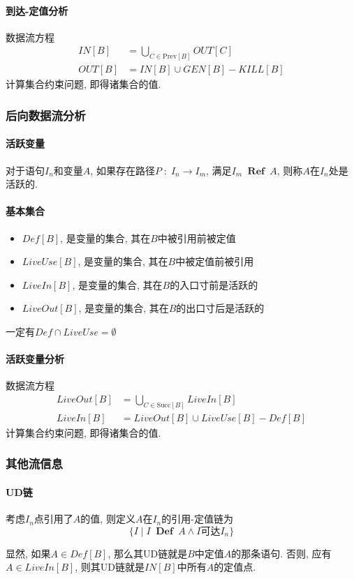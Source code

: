 \documentclass{ctexart}
\DeclareMathOperator{\Def}{\;\mathbf{Def}\;}
\DeclareMathOperator{\Ref}{\;\mathbf{Ref}\;}
\begin{document}
\paragraph{到达-定值分析}
    数据流方程
    \begin{align*}
        IN[B] &= \bigcup_{C \in \mathrm{Prev}[B]} OUT[C]\\
        OUT[B] &= IN[B]\cup GEN[B] - KILL[B]
    \end{align*}
    计算集合约束问题, 即得诸集合的值.

\subsubsection{后向数据流分析}
\paragraph{活跃变量} 
    对于语句$I_n$和变量$A$, 如果存在路径$P\;:\;I_n\to I_m$,
    满足$I_m \Ref A$, 则称$A$在$I_n$处是活跃的.
\paragraph{基本集合}
    \begin{itemize}
        \item $Def[B]$, 是变量的集合, 其在$B$中被引用前被定值
        \item $LiveUse[B]$, 是变量的集合, 其在$B$中被定值前被引用
        \item $LiveIn[B]$, 是变量的集合, 其在$B$的入口寸前是活跃的
        \item $LiveOut[B]$, 是变量的集合, 其在$B$的出口寸后是活跃的
    \end{itemize}
    一定有$Def \cap LiveUse = \emptyset$
\paragraph{活跃变量分析}
    数据流方程
    \begin{align*}
        LiveOut[B] &= \bigcup_{C \in \mathrm{Succ}[B]} LiveIn[B]\\
        LiveIn[B] &= LiveOut[B] \cup LiveUse[B] - Def[B]
    \end{align*}
    计算集合约束问题, 即得诸集合的值.

\subsubsection{其他流信息}
\paragraph{UD链} 考虑$I_n$点引用了$A$的值, 则定义$A$在$I_n$的引用-定值链为
    \[\{ I \;|\; I \Def A \land I \text{可达} I_n\}\]\par
    显然, 如果$A \in Def[B]$, 那么其UD链就是$B$中定值$A$的那条语句.
    否则, 应有$A \in LiveIn[B]$, 则其UD链就是$IN[B]$中所有$A$的定值点.
\end{document}
